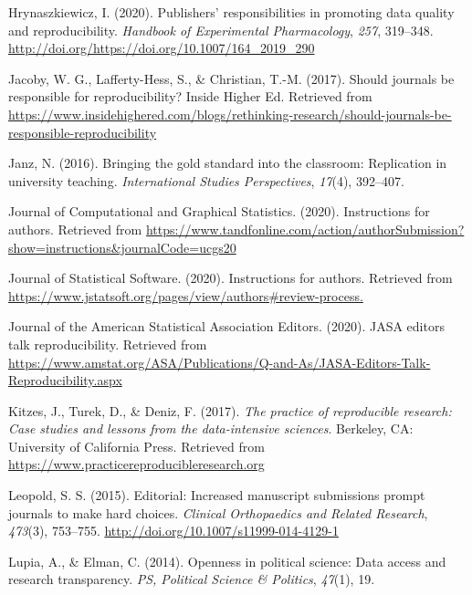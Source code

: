 \documentclass[12pt,twoside]{reedthesis}
\begin{document}
\leavevmode\hypertarget{ref-hrynaszkiewicz2020publishers}{}%
Hrynaszkiewicz, I. (2020). Publishers' responsibilities in promoting data quality and reproducibility. \emph{Handbook of Experimental Pharmacology}, \emph{257}, 319--348. \url{http://doi.org/https://doi.org/10.1007/164_2019_290}

\leavevmode\hypertarget{ref-higher-ed}{}%
Jacoby, W. G., Lafferty-Hess, S., \& Christian, T.-M. (2017). Should journals be responsible for reproducibility? Inside Higher Ed. Retrieved from \url{https://www.insidehighered.com/blogs/rethinking-research/should-journals-be-responsible-reproducibility}

\leavevmode\hypertarget{ref-janz2016bringing}{}%
Janz, N. (2016). Bringing the gold standard into the classroom: Replication in university teaching. \emph{International Studies Perspectives}, \emph{17}(4), 392--407.

\leavevmode\hypertarget{ref-jcgs-guide}{}%
Journal of Computational and Graphical Statistics. (2020). Instructions for authors. Retrieved from \url{https://www.tandfonline.com/action/authorSubmission?show=instructions\&journalCode=ucgs20}

\leavevmode\hypertarget{ref-jss-guide}{}%
Journal of Statistical Software. (2020). Instructions for authors. Retrieved from \url{https://www.jstatsoft.org/pages/view/authors\#review-process.}

\leavevmode\hypertarget{ref-jasa-rep-editors}{}%
Journal of the American Statistical Association Editors. (2020). JASA editors talk reproducibility. Retrieved from \url{https://www.amstat.org/ASA/Publications/Q-and-As/JASA-Editors-Talk-Reproducibility.aspx}

\leavevmode\hypertarget{ref-kitzes2017practice}{}%
Kitzes, J., Turek, D., \& Deniz, F. (2017). \emph{The practice of reproducible research: Case studies and lessons from the data-intensive sciences}. Berkeley, CA: University of California Press. Retrieved from \url{https://www.practicereproducibleresearch.org}

\leavevmode\hypertarget{ref-leopold2015increased}{}%
Leopold, S. S. (2015). Editorial: Increased manuscript submissions prompt journals to make hard choices. \emph{Clinical Orthopaedics and Related Research}, \emph{473}(3), 753--755. \url{http://doi.org/10.1007/s11999-014-4129-1}

\leavevmode\hypertarget{ref-lupia2014openness}{}%
Lupia, A., \& Elman, C. (2014). Openness in political science: Data access and research transparency. \emph{PS, Political Science \& Politics}, \emph{47}(1), 19.
\end{document}

